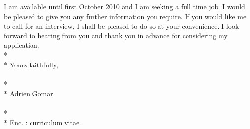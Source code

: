\documentclass[11pt]{article}
\begin{document}
\noindent
I am available until first October 2010 and I am seeking 
a full time job. I would be pleased to give you any 
further information you require. If you would like me 
to call for an interview, I shall be pleased to do so 
at your convenience. I look forward to hearing from you 
and thank you in advance for considering my application.
\\*
\\*
Yours faithfully, \\
\\*
\\*
Adrien Gomar \\
\\*
\\*
Enc. : curriculum vitae
\end{document}
